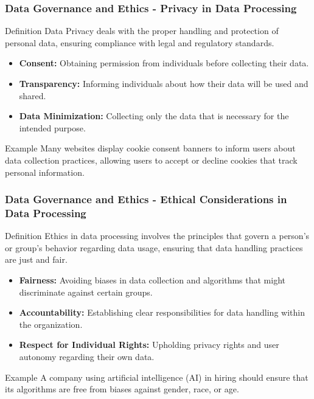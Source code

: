 \documentclass[aspectratio=169]{beamer}
\begin{document}
\begin{frame}[fragile]
    \frametitle{Data Governance and Ethics - Privacy in Data Processing}
    
    \begin{block}{Definition}
        Data Privacy deals with the proper handling and protection of personal data, ensuring compliance with legal and regulatory standards.
    \end{block}
    
    \begin{itemize}
        \item \textbf{Consent:} Obtaining permission from individuals before collecting their data.
        \item \textbf{Transparency:} Informing individuals about how their data will be used and shared.
        \item \textbf{Data Minimization:} Collecting only the data that is necessary for the intended purpose.
    \end{itemize}

    \begin{block}{Example}
        Many websites display cookie consent banners to inform users about data collection practices, allowing users to accept or decline cookies that track personal information.
    \end{block}
\end{frame}

\begin{frame}[fragile]
    \frametitle{Data Governance and Ethics - Ethical Considerations in Data Processing}
    
    \begin{block}{Definition}
        Ethics in data processing involves the principles that govern a person's or group's behavior regarding data usage, ensuring that data handling practices are just and fair.
    \end{block}
    
    \begin{itemize}
        \item \textbf{Fairness:} Avoiding biases in data collection and algorithms that might discriminate against certain groups.
        \item \textbf{Accountability:} Establishing clear responsibilities for data handling within the organization.
        \item \textbf{Respect for Individual Rights:} Upholding privacy rights and user autonomy regarding their own data.
    \end{itemize}

    \begin{block}{Example}
        A company using artificial intelligence (AI) in hiring should ensure that its algorithms are free from biases against gender, race, or age.
    \end{block}
\end{frame}
\end{document}
